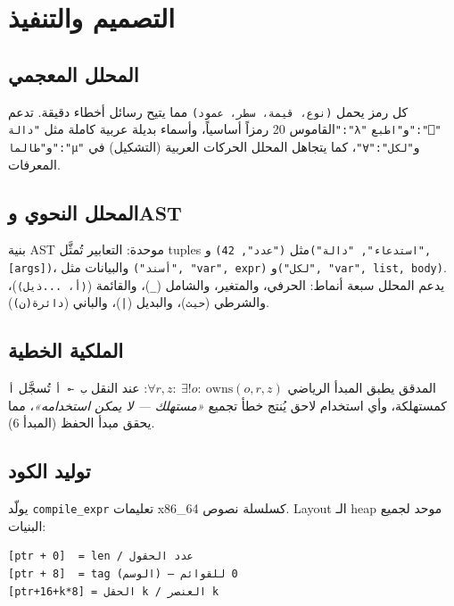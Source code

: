 \documentclass[sigconf]{acmart}
\begin{document}
\section{التصميم والتنفيذ}
\label{sec:design}

\subsection{المحلل المعجمي}
\label{sec:design:lexer}

كل رمز يحمل \texttt{(نوع، قيمة، سطر، عمود)} مما يتيح رسائل أخطاء دقيقة. تدعم
القاموس 20 رمزاً أساسياً، وأسماء بديلة عربية كاملة مثل
\texttt{"دالة":"λ"} و\texttt{"اطبع":"⎕"} و\texttt{"طالما":"μ"} و\texttt{"لكل":"∀"}،
كما يتجاهل المحلل الحركات العربية (التشكيل) في المعرفات.

\subsection{المحلل النحوي وAST}
\label{sec:design:parser}

بنية AST موحدة: التعابير تُمثَّل tuples مثل \texttt{("عدد", 42)} و\texttt{("استدعاء",
"دالة", [args])}، والبيانات مثل \texttt{("أسند", "var", expr)} و\texttt{("لكل",
"var", list, body)}. يدعم المحلل سبعة أنماط: الحرفي، والمتغير، والشامل (\texttt{\_})،
والقائمة (\texttt{⟨أ، ...ذيل⟩})، والشرطي (\texttt{حيث})، والبديل (\texttt{|})،
والباني (\texttt{دائرة(ن)}).

\subsection{الملكية الخطية}
\label{sec:design:ownership}

المدقق يطبق المبدأ الرياضي $\forall r,z:\ \exists! o:\ \mathrm{owns}(o,r,z)$:
عند النقل \texttt{ب ⊸ أ} تُسجَّل \texttt{أ} كمستهلكة، وأي استخدام لاحق يُنتج
خطأ تجميع \emph{«مستهلك — لا يمكن استخدامه»}، مما يحقق مبدأ الحفظ (المبدأ 6).

\subsection{توليد الكود}
\label{sec:design:codegen}

يولّد \texttt{compile\_expr} تعليمات x86\_64 كسلسلة نصوص. Layout الـ heap موحد
لجميع البنيات:

\begin{verbatim}
[ptr + 0]  = len / عدد الحقول
[ptr + 8]  = tag (الوسم) — 0 للقوائم
[ptr+16+k*8] = الحقل k / العنصر k
\end{verbatim}
\end{document}
